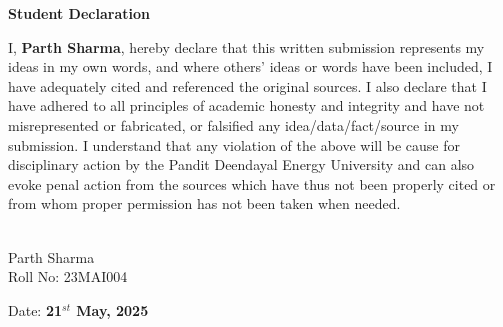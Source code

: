 \begin{center}
	\textbf{\large Student Declaration}
\end{center}

I, \textcolor{internationalkleinblue}{\textbf{Parth Sharma}}, hereby declare that this written submission represents my ideas in my own words, and where others’ ideas or words have been included, I have adequately cited and referenced the original sources. I also declare that I have adhered to all principles of academic honesty and integrity and have not misrepresented or fabricated, or falsified any idea/data/fact/source in my submission. I understand that any violation of the above will be cause for disciplinary action by the Pandit Deendayal Energy University and can also evoke penal action from the sources which have thus not been properly cited or from whom proper permission has not been taken when needed.
\vspace{0.8cm}
\vspace{0.8cm}
\begin{flushright}
    \makebox[1.8in]{\hrulefill}\\
    Parth Sharma\\
    Roll No: 23MAI004\\
\end{flushright}
\vfill
\begin{flushleft}
	Date: \textbf{21$^{st}$ May, 2025}
\end{flushleft} 